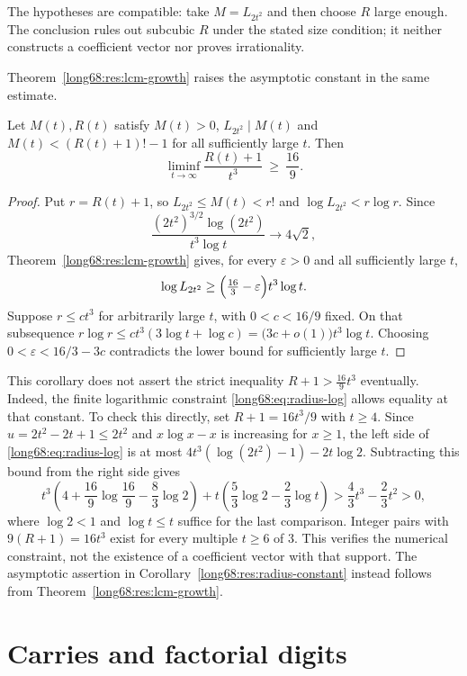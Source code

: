 \documentclass[11pt]{article}
\newcommand{\Lc}{L}
\begin{document}
The hypotheses are compatible: take $M=\Lc_{2t^2}$ and then choose
$R$ large enough. The conclusion rules out subcubic $R$ under the
stated size condition; it neither constructs a coefficient vector nor
proves irrationality.

Theorem~\ref{long68:res:lcm-growth} raises the asymptotic constant in the same
estimate.

\begin{corollary}\label{long68:res:radius-constant}
Let $M(t),R(t)$ satisfy $M(t)>0$, $\Lc_{2t^2}\mid M(t)$ and
$M(t)<(R(t)+1)!-1$ for all sufficiently large $t$.  Then
\[
 \liminf_{t\to\infty}\frac{R(t)+1}{t^3}\ \ge\ \frac{16}{9}.
\]
\end{corollary}

\begin{proof}
Put $r=R(t)+1$, so $\Lc_{2t^2}\le M(t)<r!$ and $\log \Lc_{2t^2}<r\log r$.
Since
\[
\frac{(2t^2)^{3/2}\log(2t^2)}{t^3\log t}\longrightarrow4\sqrt2,
\]
Theorem~\ref{long68:res:lcm-growth} gives, for every $\varepsilon>0$ and
all sufficiently large $t$,
\[
 \log \Lc_{2t^2}\ge
 \Bigl(\tfrac{16}{3}-\varepsilon\Bigr)t^3\log t.
\]
Suppose $r\le ct^3$ for arbitrarily large $t$, with $0<c<16/9$ fixed.  On that
subsequence $r\log r\le ct^3(3\log t+\log c)=\bigl(3c+o(1)\bigr)t^3\log t$.
Choosing $0<\varepsilon<16/3-3c$ contradicts the lower bound for
sufficiently large $t$.
\end{proof}

This corollary does not assert the strict inequality
$R+1>\tfrac{16}9t^3$ eventually. Indeed, the finite logarithmic constraint
\eqref{long68:eq:radius-log} allows equality at that constant. To check
this directly, set $R+1=16t^3/9$ with $t\ge4$. Since
$u=2t^2-2t+1\le2t^2$ and $x\log x-x$ is increasing for $x\ge1$, the
left side of \eqref{long68:eq:radius-log} is at most
$4t^3(\log(2t^2)-1)-2t\log2$. Subtracting this bound from the right side gives
\[
 t^3\left(4+\frac{16}{9}\log\frac{16}{9}-\frac83\log2\right)
 +t\left(\frac53\log2-\frac23\log t\right)
 >\frac43t^3-\frac23t^2>0,
\]
where $\log2<1$ and $\log t\le t$ suffice for the last comparison.
Integer pairs with $9(R+1)=16t^3$ exist for every multiple $t\ge6$ of $3$.
This verifies the numerical constraint, not the existence of a coefficient
vector with that support. The asymptotic assertion in
Corollary~\ref{long68:res:radius-constant} instead follows from
Theorem~\ref{long68:res:lcm-growth}.

\section{Carries and factorial digits}\label{long68:sec:carry}
\end{document}
